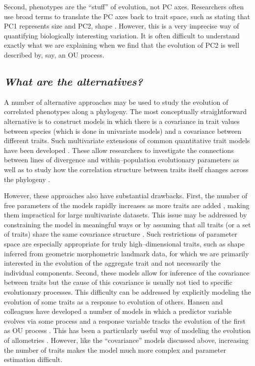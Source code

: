 \documentclass[a4paper,12pt]{article}
\begin{document}
Second, phenotypes are the ``stuff'' of evolution, not PC axes. Researchers often use broad terms to translate the PC axes back to trait space, such as stating that PC1 represents size and PC2, shape \citep[e.g.,][]{Harmon2010, Price2014}. However, this is a very imprecise way of quantifying biologically interesting variation. It is often difficult to understand exactly what we are explaining when we find that the evolution of PC2 is well described by, say, an OU process. 

\subsection{\emph{What are the alternatives?}}

A number of alternative approaches may be used to study the evolution of correlated phenotypes along a phylogeny. The most conceptually straightforward alternative is to construct models in which there is a covariance in trait values between species (which is done in univariate models) and a covariance between different traits. Such multivariate extensions of common quantitative trait models have been developed \citep{ButlerKing2004, RevellHarmon2008, Hohenlohe2008, RevellCollar2009, motmot}. These allow researchers to investigate the connections between lines of divergence and within--population evolutionary parameters \citep{Hohenlohe2008} as well as to study how the correlation structure between traits itself changes across the phylogeny \citep{RevellCollar2009}. 

However, these approaches also have substantial drawbacks. First, the number of free parameters of the models rapidly increases as more traits are added \citep{RevellHarmon2008}, making them impractical for large multivariate datasets. This issue may be addressed by constraining the model in meaningful ways \citep{ButlerKing2004} or by assuming that all traits (or a set of traits) share the same covariance structure \citep{Klingenberg2013, Adams2014}. Such restrictions of parameter space are especially appropriate for truly high--dimensional traits, such as shape inferred from geometric morphometric landmark data, for which we are primarily interested in the evolution of the aggregate trait and not necessarily the individual components. Second, these models allow for inference of the covariance between traits but the cause of this covariance is usually not tied to specific evolutionary processes. This difficulty can be addressed by explicitly modeling the evolution of some traits as a response to evolution of others. Hansen and colleagues have developed a number of models in which a predictor variable evolves via some process and a response variable tracks the evolution of the first as OU process \citep{Hansen2008, Hansen2012SysBio, Bartoszek2012}. This has been a particularly useful way of modeling the evolution of allometries \citep{Hansen2012SysBio, Voje2013}. However, like the ``covariance''  models discussed above, increasing the number of traits makes the model much more complex and parameter estimation difficult.
\end{document}
